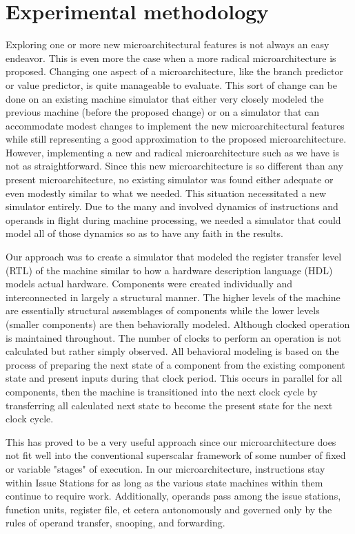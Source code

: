 \documentclass[10pt,dvips]{article}
\begin{document}
\section{Experimental methodology}
%
Exploring one or more new microarchitectural features is
not always an easy endeavor.  This is even more the case
when a more radical microarchitecture is proposed.
Changing one aspect of a microarchitecture, like
the branch predictor or value predictor, is quite manageable to
evaluate.  This sort of change can be done on an existing machine simulator
that either very closely modeled the previous machine (before the
proposed change) or on a simulator that can accommodate modest
changes to implement the new microarchitectural features
while still representing a good approximation to the proposed
microarchitecture.
However, implementing a new and radical microarchitecture
such as we have is not as straightforward.
Since this new microarchitecture is so different than any
present microarchitecture, no existing simulator was found
either adequate or even modestly similar to what we needed.
This situation necessitated a new simulator entirely.
Due to the many and involved dynamics of instructions and
operands in flight during machine processing, we needed a simulator
that could model all of those dynamics so as to have
any faith in the results.  

Our approach was to create a simulator
that modeled the register transfer level (RTL) of the machine
similar to how a hardware description language (HDL) models
actual hardware.  Components were created individually
and interconnected in largely a structural manner.
The higher levels of the machine are essentially structural
assemblages of components while the lower levels (smaller components)
are then behaviorally modeled.  Although clocked operation is
maintained throughout.
The number of clocks to perform an operation is not calculated
but rather simply observed.  All behavioral modeling is
based on the process of preparing the next state of a component
from the existing component state and present inputs during that
clock period.  This occurs in parallel for all components,
then the machine is transitioned into the next clock cycle by
transferring all calculated next state to become the present
state for the next clock cycle.

This has proved to be a very useful approach since our
microarchitecture does not fit well into the conventional
superscalar framework of some number of fixed or variable "stages"
of execution.  In our microarchitecture, instructions stay
within Issue Stations for as long as the various state machines
within them continue to require work.  Additionally, operands
pass among the issue stations, function units, register file, et
cetera autonomously and governed only by the rules of operand
transfer, snooping, and forwarding.
\end{document}
